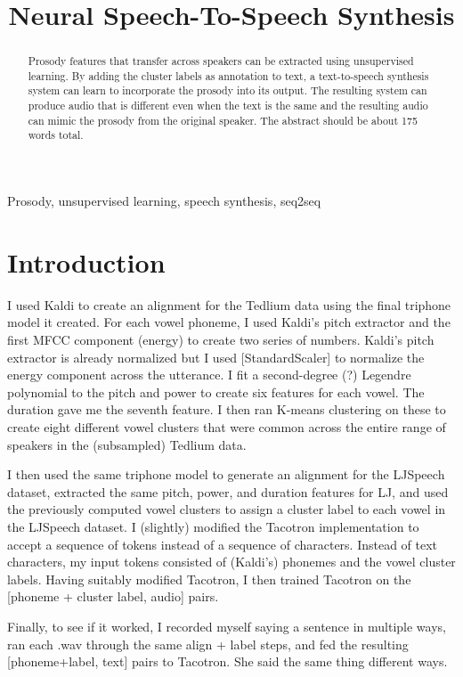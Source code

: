 \documentclass{article}
\title{Neural Speech-To-Speech Synthesis}
\begin{document}
%
\maketitle
%
\begin{abstract}
  Prosody features that transfer across speakers can be extracted using unsupervised learning. By adding the cluster labels as annotation to text, a text-to-speech synthesis system can learn to incorporate the prosody into its output. The resulting system can produce audio that is different even when the text is the same and the resulting audio can mimic the prosody from the original speaker. The abstract should be about 175 words total.
\end{abstract}
%
\begin{keywords}
Prosody, unsupervised learning, speech synthesis, seq2seq
\end{keywords}
%
\section{Introduction}
\label{sec:intro}

I used Kaldi \cite{Povey_ASRU2011} to create an alignment for the Tedlium data using the final triphone model it created. For each vowel phoneme, I used Kaldi's pitch extractor and the first MFCC component (energy) to create two series of numbers. Kaldi's pitch extractor is already normalized but I used [StandardScaler] to normalize the energy component across the utterance. I fit a second-degree (?) Legendre polynomial to the pitch and power to create six features for each vowel. The duration gave me the seventh feature. I then ran K-means clustering on these to create eight different vowel clusters that were common across the entire range of speakers in the (subsampled) Tedlium data.

I then used the same triphone model to generate an alignment for the LJSpeech dataset, extracted the same pitch, power, and duration features for LJ, and used the previously computed vowel clusters to assign a cluster label to each vowel in the LJSpeech dataset. I (slightly) modified the Tacotron implementation to accept a sequence of tokens instead of a sequence of characters. Instead of text characters, my input tokens consisted of (Kaldi's) phonemes and the vowel cluster labels. Having suitably modified Tacotron, I then trained Tacotron on the [phoneme + cluster label, audio] pairs.

Finally, to see if it worked, I recorded myself saying a sentence in multiple ways, ran each .wav through the same align + label steps, and fed the resulting [phoneme+label, text] pairs to Tacotron. She said the same thing different ways.
\end{document}
